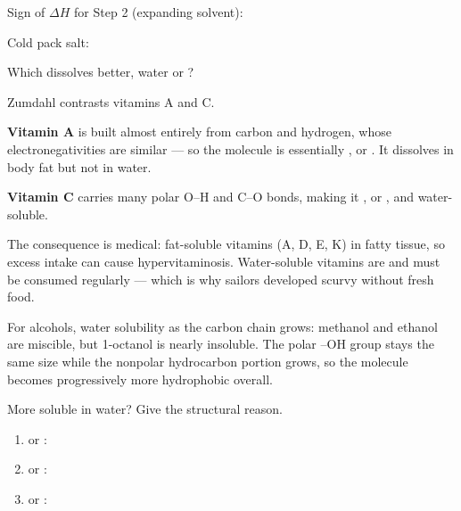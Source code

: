 \documentclass{apchem-notes}
\begin{document}

\begin{warmup}[3]
  \item Sign of $\Delta H$ for Step 2 (expanding solvent):
  \item Cold pack salt: 
  \item Which dissolves  better, water or ?
\end{warmup}



\begin{workedexample}
Zumdahl contrasts vitamins A and C.

\textbf{Vitamin A} is built almost entirely from carbon and hydrogen, whose
electronegativities are similar --- so the molecule is essentially
, or . It dissolves in body
fat but not in water.

\textbf{Vitamin C} carries many polar O--H and C--O bonds, making it
, or , and water-soluble.

The consequence is medical: fat-soluble vitamins (A, D, E, K)
 in fatty tissue, so excess intake can cause
hypervitaminosis. Water-soluble vitamins are
 and must be consumed regularly --- which is
why sailors developed scurvy without fresh food.
\end{workedexample}


For alcohols, water solubility  as the carbon
chain grows: methanol and ethanol are miscible, but 1-octanol is nearly
insoluble. The polar --OH group stays the same size while the nonpolar
hydrocarbon portion grows, so the molecule becomes progressively more
hydrophobic overall.


More soluble in water? Give the structural reason.
\begin{enumerate}[leftmargin=*,itemsep=0.3em]
  \item {} or :
  \item {} or :
  \item {} or :
\end{enumerate}
\end{document}
